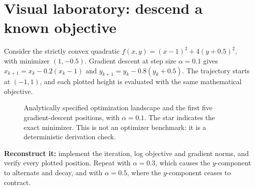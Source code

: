 \clearpage
\section*{Visual laboratory: descend a known objective}
\noindent Consider the strictly convex quadratic
\(f(x,y)=(x-1)^2+4(y+0.5)^2\), with minimizer
\((1,-0.5)\). Gradient descent at step size \(\alpha=0.1\) gives
\(x_{k+1}=x_k-0.2(x_k-1)\) and
\(y_{k+1}=y_k-0.8(y_k+0.5)\).
The trajectory starts at \((-1,1)\), and each plotted height is evaluated
with the same mathematical objective.
\begin{figure}[!htbp]
\centering
{}
\caption{Analytically specified optimization landscape and the first five
gradient-descent positions, with \(\alpha=0.1\). The star indicates the exact
minimizer. This is not an optimizer benchmark: it is a deterministic
derivation check.}
\label{fig:book02-optimization-landscape}
\end{figure}
\noindent\textbf{Reconstruct it:} implement the iteration, log objective
and gradient norms, and verify every plotted position. Repeat with
\(\alpha=0.3\), which causes the \(y\)-component to alternate and decay,
and with \(\alpha=0.5\), where the \(y\)-component ceases to contract.
